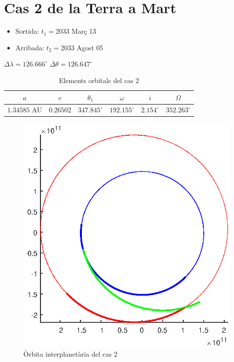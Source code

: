 \section{Cas 2 de la Terra a Mart}
\begin{itemize}
	\item Sortida: $t_{1}=$2033 Març 13
	\item Arribada: $t_{2}=$2033 Agost 05
\end{itemize}
$\Delta\lambda=126.666^{\circ}$
$\Delta\theta=126.647^{\circ}$
\begin{table}[h!]
	\centering
	\begin{tabular}{ |c|c|c|c|c|c|}
		\hline
		$a$ & $e$ & $\theta_{1}$ & $\omega$ & $i$ & $\Omega$ \\ \hline
		$1.34585$ AU  & $0.26502$ & $347.845^{\circ}$ & $192.155^{\circ}$ & $2.154^{\circ}$ & $352.263^{\circ}$ \\ \hline
	\end{tabular}
	\caption{Elements orbitals del cas 2}
\end{table}
\begin{figure}[H]
	\centering
	\includegraphics[scale=0.8]{./plots/cas2}
	\caption{Òrbita interplanetària del cas 2}
\end{figure}

